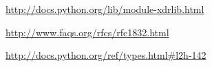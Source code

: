 \documentclass[12pt,legalpaper]{report}
\begin{document}
\begin{thebibliography}{30}
\href{http://docs.python.org/lib/module-xdrlib.html}{http://docs.python.org/lib/module-xdrlib.html}

\href{http://www.faqs.org/rfcs/rfc1832.html}{http://www.faqs.org/rfcs/rfc1832.html}

\href{http://docs.python.org/ref/types.html#l2h-142}{http://docs.python.org/ref/types.html\#l2h-142}













\end{thebibliography}
\end{document}
